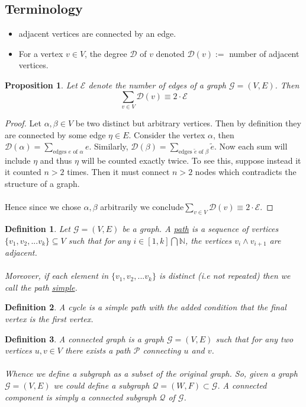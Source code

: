 \documentclass[9pt]{article} %
\newtheorem*{def_}{Definition}
\newtheorem{prop}{Proposition}
\newcommand{\G}{\mathcal{G}}
\begin{document}
		\subsection*{Terminology}
		\begin{itemize}
			\item adjacent vertices are connected by an edge.
			\item For a vertex $v \in V$, the degree $\mathcal{D}$ of $v$ denoted $\mathcal{D}(v) := $ number of adjacent vertices.
			
		\end{itemize}
		\begin{prop}
			Let $\mathcal{E}$ denote the number of edges of a graph $\G = (V,E)$. Then
			$$ \sum_{v \in V} \mathcal{D}(v) \equiv 2 \cdot \mathcal{E} $$
		\end{prop}
		\begin{proof}
			Let $\alpha, \beta \in V$ be two distinct but arbitrary vertices. Then by definition they are connected by some edge $\eta \in E$. Consider the vertex $\alpha$, then $\mathcal{D}(\alpha) = \sum_{\text{edges $e$ of } \alpha} e$. Similarly, $\mathcal{D}(\beta) =  \sum_{\text{edges $\tilde{e}$ of } \beta} \tilde{e}$. Now each sum will include $\eta$ and thus $\eta$ will be counted exactly twice. To see this, suppose instead it it counted $n > 2$ times. Then it must connect $n > 2$ nodes which contradicts the structure of a graph. \\  \\
			Hence since we chose $\alpha, \beta$ arbitrarily we conclude$ \sum_{v \in V} \mathcal{D}(v) \equiv 2 \cdot \mathcal{E} $.
		\end{proof}
		
		\begin{def_}
			Let $\G = (V,E)$ be a graph. A \underline{path} is a sequence of vertices $\{v_1, v_2, ... v_k \} \subseteq V$ such that for any $i \in [1,k]\bigcap \mathbb{N}$, the vertices $v_i \wedge v_{i+1}$ are adjacent. \\ \\
			Moreover, if each element in $\{v_1, v_2, ... v_k \}$ is distinct (i.e not repeated) then we call the path \underline{simple}.
		\end{def_}
		
		\begin{def_}
			A cycle is a simple path with the added condition that the final vertex is the first vertex.
		\end{def_}
		\begin{def_}
			A connected graph is a graph $\G = (V,E)$ such that for any two vertices $u,v \in V$ there exists a path $\mathcal{P}$ connecting $u$ and $v$. \\ \\
			Whence we define a subgraph as a subset of the original graph. So, given a graph $\G = (V,E)$ we could define a subgraph $\mathcal{Q} = (W,F) \subset \G$. A connected component is simply a connected subgraph $\mathcal{Q}$ of $\G$.
		\end{def_}
		
\end{document}

